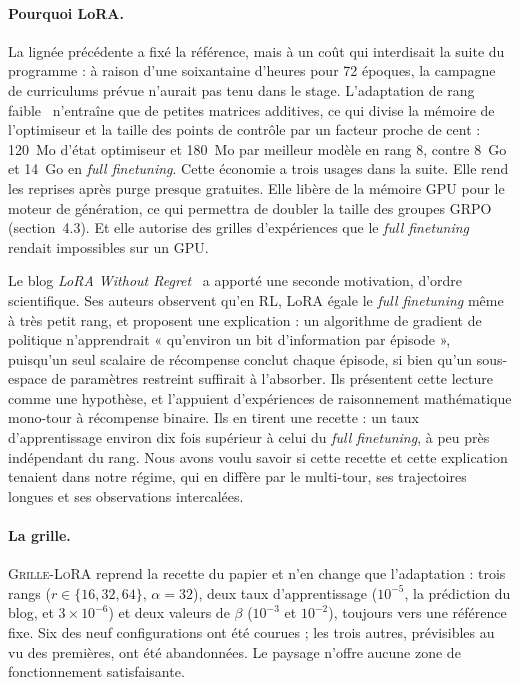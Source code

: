 \documentclass[11pt,a4paper]{article}
\begin{document}
\paragraph{Pourquoi LoRA.} La lignée précédente a fixé la référence, mais à un coût qui interdisait la suite du programme : à raison d'une soixantaine d'heures pour 72 époques, la campagne de curriculums prévue n'aurait pas tenu dans le stage. L'adaptation de rang faible~\cite{hu2022lora} n'entraîne que de petites matrices additives, ce qui divise la mémoire de l'optimiseur et la taille des points de contrôle par un facteur proche de cent : 120~Mo d'état optimiseur et 180~Mo par meilleur modèle en rang 8, contre 8~Go et 14~Go en \emph{full finetuning}. Cette économie a trois usages dans la suite. Elle rend les reprises après purge presque gratuites. Elle libère de la mémoire GPU pour le moteur de génération, ce qui permettra de doubler la taille des groupes GRPO (section~4.3). Et elle autorise des grilles d'expériences que le \emph{full finetuning} rendait impossibles sur un GPU.

Le blog \emph{LoRA Without Regret}~\cite{schulman2025lora} a apporté une seconde motivation, d'ordre scientifique. Ses auteurs observent qu'en RL, LoRA égale le \emph{full finetuning} même à très petit rang, et proposent une explication : un algorithme de gradient de politique n'apprendrait « qu'environ un bit d'information par épisode », puisqu'un seul scalaire de récompense conclut chaque épisode, si bien qu'un sous-espace de paramètres restreint suffirait à l'absorber. Ils présentent cette lecture comme une hypothèse, et l'appuient d'expériences de raisonnement mathématique mono-tour à récompense binaire. Ils en tirent une recette : un taux d'apprentissage environ dix fois supérieur à celui du \emph{full finetuning}, à peu près indépendant du rang. Nous avons voulu savoir si cette recette et cette explication tenaient dans notre régime, qui en diffère par le multi-tour, ses trajectoires longues et ses observations intercalées.

\paragraph{La grille.} \textsc{Grille-LoRA} reprend la recette du papier et n'en change que l'adaptation : trois rangs ($r \in \{16, 32, 64\}$, $\alpha = 32$), deux taux d'apprentissage ($10^{-5}$, la prédiction du blog, et $3 \times 10^{-6}$) et deux valeurs de $\beta$ ($10^{-3}$ et $10^{-2}$), toujours vers une référence fixe. Six des neuf configurations ont été courues ; les trois autres, prévisibles au vu des premières, ont été abandonnées. Le paysage n'offre aucune zone de fonctionnement satisfaisante.
\end{document}
